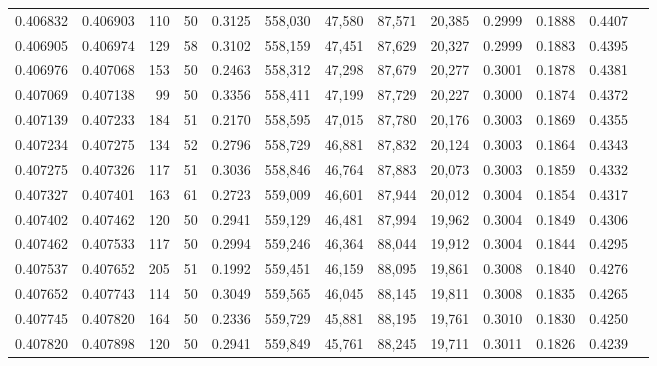 \begin{tabular}{rrrrrrrrrrrrr}
0.406832 & 0.406903 &   110 &  50 &                                     0.3125 & 558,030 &  47,580 &  87,571 &  20,385 & 0.2999 & 0.1888 & 0.4407 \\
0.406905 & 0.406974 &   129 &  58 &                                     0.3102 & 558,159 &  47,451 &  87,629 &  20,327 & 0.2999 & 0.1883 & 0.4395 \\
0.406976 & 0.407068 &   153 &  50 &                                     0.2463 & 558,312 &  47,298 &  87,679 &  20,277 & 0.3001 & 0.1878 & 0.4381 \\
0.407069 & 0.407138 &    99 &  50 &                                     0.3356 & 558,411 &  47,199 &  87,729 &  20,227 & 0.3000 & 0.1874 & 0.4372 \\
0.407139 & 0.407233 &   184 &  51 &                                     0.2170 & 558,595 &  47,015 &  87,780 &  20,176 & 0.3003 & 0.1869 & 0.4355 \\
0.407234 & 0.407275 &   134 &  52 &                                     0.2796 & 558,729 &  46,881 &  87,832 &  20,124 & 0.3003 & 0.1864 & 0.4343 \\
0.407275 & 0.407326 &   117 &  51 &                                     0.3036 & 558,846 &  46,764 &  87,883 &  20,073 & 0.3003 & 0.1859 & 0.4332 \\
0.407327 & 0.407401 &   163 &  61 &                                     0.2723 & 559,009 &  46,601 &  87,944 &  20,012 & 0.3004 & 0.1854 & 0.4317 \\
0.407402 & 0.407462 &   120 &  50 &                                     0.2941 & 559,129 &  46,481 &  87,994 &  19,962 & 0.3004 & 0.1849 & 0.4306 \\
0.407462 & 0.407533 &   117 &  50 &                                     0.2994 & 559,246 &  46,364 &  88,044 &  19,912 & 0.3004 & 0.1844 & 0.4295 \\
0.407537 & 0.407652 &   205 &  51 &                                     0.1992 & 559,451 &  46,159 &  88,095 &  19,861 & 0.3008 & 0.1840 & 0.4276 \\
0.407652 & 0.407743 &   114 &  50 &                                     0.3049 & 559,565 &  46,045 &  88,145 &  19,811 & 0.3008 & 0.1835 & 0.4265 \\
0.407745 & 0.407820 &   164 &  50 &                                     0.2336 & 559,729 &  45,881 &  88,195 &  19,761 & 0.3010 & 0.1830 & 0.4250 \\
0.407820 & 0.407898 &   120 &  50 &                                     0.2941 & 559,849 &  45,761 &  88,245 &  19,711 & 0.3011 & 0.1826 & 0.4239 \\

\end{tabular}
